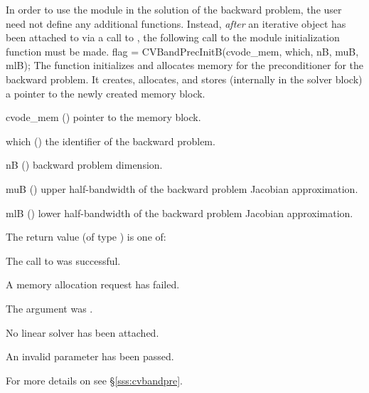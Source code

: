 In order to use the {\cvbandpre} module in the solution of the backward problem,
the user need not define any additional functions.
Instead, {\em after} an iterative {\sunlinsol} object has been
attached to {\cvodes} via a call to , the
following call to the {\cvbandpre} module initialization function must be made.
{
  flag = CVBandPrecInitB(cvode\_mem, which, nB, muB, mlB);
}
{
  The function  initializes and allocates
  memory for the {\cvbandpre} preconditioner for the backward problem.
  It creates, allocates, and stores (internally in the {\cvodes}
  solver block) a pointer to the newly created {\cvbandpre} memory block.
}
{
  \begin{args}
  \item[cvode\_mem] ()
    pointer to the {\cvodes} memory block.
  \item[which] ()
    the identifier of the backward problem.
  \item[nB] ()
    backward problem dimension.
  \item[muB] ()
    upper half-bandwidth of the backward problem Jacobian approximation.
  \item[mlB] ()
    lower half-bandwidth of the backward problem Jacobian approximation.
  \end{args}
}
{
  The return value  (of type ) is one of:
  \begin{args}
  \item[\Id{CVLS\_SUCCESS}]
    The call to  was successful.
  \item[\Id{CVLS\_MEM\_FAIL}]
    A memory allocation request has failed.
  \item[\Id{CVLS\_MEM\_NULL}]
    The  argument was .
  \item[\Id{CVLS\_LMEM\_NULL}]
    No linear solver has been attached.
  \item[\Id{CVLS\_ILL\_INPUT}]
    An invalid parameter has been passed.
  \end{args}
}
{}
For more details on {\cvbandpre} see \S\ref{sss:cvbandpre}.



